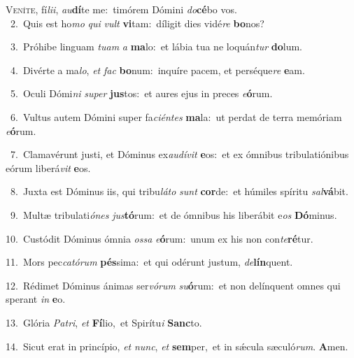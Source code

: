 \lettrine{\initial\textcolor{\initialcolor}{V}}{eníte,} fí\-\textit{li}\-\textit{i}, \textit{au}\-\textbf{dí}te me:~\star timórem Dómini \textit{do}\-\textbf{cé}bo vos.\\
{\numbfont\textcolor{\numbcolor}{~2.}}~Quis est ho\textit{mo} \textit{qui} \textit{vult} \textbf{vi}\-tam:~\star díligit dies vidé\textit{re} \textbf{bo}\-nos?\par
{\numbfont\textcolor{\numbcolor}{~3.}}~Próhibe linguam \textit{tu}\-\textit{am} \textit{a} \textbf{ma}\-lo:~\star et lábia tua ne loquán\textit{tur} \textbf{do}\-lum.\par
{\numbfont\textcolor{\numbcolor}{~4.}}~Divérte a ma\-\textit{lo}\-, \textit{et} \textit{fac} \textbf{bo}\-num:~\star inquíre pacem, et perséque\textit{re} \textbf{e}\-am.\par
{\numbfont\textcolor{\numbcolor}{~5.}}~Oculi Dómi\textit{ni} \textit{su}\-\textit{per} \textbf{jus}\-tos:~\star et aures ejus in preces \textit{e}\-\textbf{ó}rum.\par
{\numbfont\textcolor{\numbcolor}{~6.}}~Vultus autem Dómini super fa\-\textit{ci}\-\textit{én}\textit{tes} \textbf{ma}\-la:~\star ut perdat de terra memóriam \textit{e}\-\textbf{ó}rum.\par
{\numbfont\textcolor{\numbcolor}{~7.}}~Clamavérunt justi, et Dóminus ex\-\textit{au}\-\textit{dí}\textit{vit} \textbf{e}\-os:~\star et ex ómnibus tribulatiónibus eórum liberá\textit{vit} \textbf{e}\-os.\par
{\numbfont\textcolor{\numbcolor}{~8.}}~Juxta est Dóminus iis, qui tribu\-\textit{lá}\-\textit{to} \textit{sunt} \textbf{cor}\-de:~\star et húmiles spíritu \textit{sal}\-\textbf{vá}bit.\par
{\numbfont\textcolor{\numbcolor}{~9.}}~Multæ tribulati\-\textit{ó}\-\textit{nes} \textit{jus}\-\textbf{tó}rum:~\star et de ómnibus his liberábit e\textit{os} \textbf{Dó}\-minus.\par
{\numbfont\textcolor{\numbcolor}{10.}}~Custódit Dóminus ómnia \textit{os}\-\textit{sa} \textit{e}\-\textbf{ó}rum:~\star unum ex his non con\-\textit{te}\-\textbf{ré}tur.\par
{\numbfont\textcolor{\numbcolor}{11.}}~Mors pec\-\textit{ca}\-\textit{tó}\textit{rum} \textbf{pés}\-sima:~\star et qui odérunt justum, \textit{de}\-\textbf{lín}quent.\par
{\numbfont\textcolor{\numbcolor}{12.}}~Rédimet Dóminus ánimas ser\-\textit{vó}\-\textit{rum} \textit{su}\-\textbf{ó}rum:~\star et non delínquent omnes qui sperant \textit{in} \textbf{e}\-o.\par
{\numbfont\textcolor{\numbcolor}{13.}}~Glória \textit{Pa}\-\textit{tri}, \textit{et} \textbf{Fí}\-lio,~\star et Spirítu\textit{i} \textbf{Sanc}\-to.\par
{\numbfont\textcolor{\numbcolor}{14.}}~Sicut erat in princípio, \textit{et} \textit{nunc}\-, \textit{et} \textbf{sem}\-per,~\star et in sǽcula sæculó\-\textit{rum}\-. \textbf{A}\-men.\par
